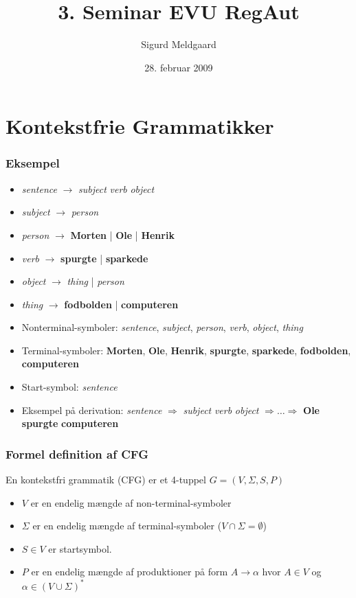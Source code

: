\documentclass{beamer}
\title{3. Seminar EVU RegAut}
\author{Sigurd Meldgaard}
\date{28. februar 2009}
\begin{document}
\maketitle

\section{Kontekstfrie Grammatikker}
\begin{frame}
\frametitle{Eksempel}
\begin{itemize}
\item \textit{sentence} $\rightarrow$  \textit{subject} \textit{verb} \textit{object}
\item \textit{subject} $\rightarrow$  \textit{person}
\item \textit{person} $\rightarrow$  \textbf{Morten}  |  \textbf{Ole}  |  \textbf{Henrik}
\item \textit{verb} $\rightarrow$  \textbf{spurgte}  |  \textbf{sparkede}
\item \textit{object} $\rightarrow$  \textit{thing}  |  \textit{person}
\item \textit{thing} $\rightarrow$  \textbf{fodbolden}  |  \textbf{computeren} 
\end{itemize}
\pause
\begin{itemize}[<+->]
\item Nonterminal-symboler:  
       \textit{sentence}, \textit{subject}, \textit{person}, \textit{verb}, \textit{object}, \textit{thing}
\item Terminal-symboler:  
       \textbf{Morten}, \textbf{Ole}, \textbf{Henrik}, \textbf{spurgte}, \textbf{sparkede},  
       \textbf{fodbolden}, \textbf{computeren}
\item Start-symbol:  \textit{sentence}
\item Eksempel på derivation: \textit{sentence} $\Rightarrow$  \textit{subject} \textit{verb} \textit{object}  $\Rightarrow \ldots \Rightarrow$  \textbf{Ole} \textbf{spurgte} \textbf{computeren}

\end{itemize}
\end{frame}

\begin{frame}
\frametitle{Formel definition af CFG}
En kontekstfri grammatik (CFG) er et 4-tuppel $G=(V,\Sigma, S, P)$
\pause
\begin{itemize}[<+->]
\item $V$ er en endelig mængde af non-terminal-symboler
\item $\Sigma$ er en endelig mængde af terminal-symboler ($V\cap\Sigma = \emptyset$)
\item $S\in V$ er startsymbol.
\item $P$ er en endelig mængde af produktioner på form $A\rightarrow  \alpha$  hvor $A\in V$ og $\alpha\in (V\cup\Sigma )^*$
\end{itemize}
\end{frame}
\end{document}
